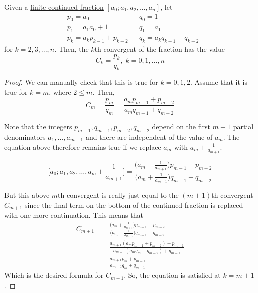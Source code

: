 \documentclass{article}
\newcounter{theorem}[section]
\begin{document}
\begin{theorem}
  \label{thm:recurrence-for-convergents}
Given a \hyperref[def:finite-continued-fraction]{finite continued fraction} $[a_0; a_1, a_2, ..., a_n]$, let 
\begin{align*}
    &p_0 = a_0 & &q_0 = 1 \\
    &p_1 = a_1 a_0 + 1 & &q_1 = a_1 \\
    &p_k = a_k p_{k-1} + p_{k-2} & &q_k = a_k q_{k-1} + q_{k-2} 
\end{align*}
for $k = 2, 3, ..., n$. Then, the $k$th convergent of the fraction has the value 
\begin{equation}
  C_k = \frac{p_k}{q_k}, \; k = 0, 1, ..., n
\end{equation}
\end{theorem}
\begin{proof}
We can manually check that this is true for $k = 0, 1, 2$. Assume that it is true for $k=m$, where $2 \leq m$. Then, 
  \begin{equation}
    C_m = \frac{p_m}{q_m} = \frac{a_m p_{m-1} + p_{m-2}}{a_m q_{m-1} + q_{m-2}}
  \end{equation}

Note that the integers $p_{m-1}, q_{m-1}, p_{m-2}, q_{m-2}$ depend on the first $m-1$ partial denominators $a_1, \ldots, a_{m-1}$ and there are independent of the value of $a_m$. The equation above therefore remains true if we replace $a_m$ with $a_m + \frac{1}{a_{m+1}}$. 

  \begin{equation}
    \Big[a_0;a_1, a_2, \ldots, a_m + \frac{1}{a_{m+1}} \Big] = \frac{\Big( a_m + \frac{1}{a_{m+1}} \Big) p_{m-1} + p_{m-2}}{\Big( a_m + \frac{1}{a_{m+1}} \Big) q_{m-1} + q_{m-2}}
  \end{equation}

But this above $m$th convergent is really just equal to the $(m+1)$th convergent $C_{m+1}$ since the final term on the bottom of the continued fraction is replaced with one more continuation. This means that
\begin{align*}
    C_{m+1} & = \frac{\Big( a_m + \frac{1}{a_{m+1}} \Big) p_{m-1} + p_{m-2}}{\Big( a_m + \frac{1}{a_{m+1}} \Big) q_{m-1} + q_{m-2}} \\
    & = \frac{a_{m+1} (a_m p_{m-1} + p_{m-2}) + p_{m-1}}{a_{m+1} (a_m q_m + q_{m-2}) + q_{m-1}} \\ 
    & = \frac{a_{m+1} p_m + p_{m-1}}{a_{m+1} q_m + q_{m-1}}
\end{align*}
Which is the desired formula for $C_{m+1}$. So, the equation is satisfied at $k=m+1$. 
\end{proof}
\end{document}
